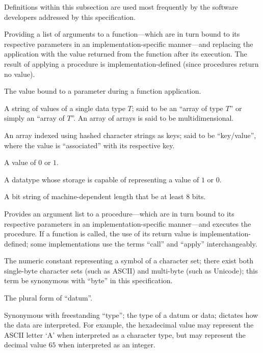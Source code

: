 %


Definitions within this subsection are used most frequently by the software
developers addressed by this specification.

\begin{description}
  Providing a list of arguments to a function---which are in turn bound to its
  respective parameters in an implementation-specific manner---and replacing the
  application with the value returned from the function after its execution. The
  result of applying a procedure is implementation-defined (since procedures
  return no value).

  The value bound to a parameter during a function application.

  A string of values of a single data type $T$; said to be an ``array of type
  $T$'' or simply an ``array of $T$''. An array of arrays is said to be
  multidimensional.

  An array indexed using hashed character strings as keys; said to be
  ``key/value'', where the value is ``associated'' with its respective key.

  A value of $0$ or $1$.

  A datatype whose storage is capable of representing a value of $1$ or $0$.

  A bit string of machine-dependent length that \shall be at least $8$ bits.

  Provides an argument list to a procedure---which are in turn bound to its
  respective parameters in an implementation-specific manner---and executes the
  procedure. If a function is called, the use of its return value is
  implementation-defined; some implementations use the terms ``call'' and
  ``apply'' interchangeably.

  The numeric constant representing a symbol of a character set; there exist
  both single-byte character sets (such as ASCII) and multi-byte (such as
  Unicode); this term \shallnot be synonymous with ``byte'' in this
  specification.

  The plural form of ``datum''.

  Synonymous with freestanding ``type''; the type of a datum or data; dictates
  how the data are interpreted. For example, the hexadecimal value  may
  represent the ASCII letter `A' when interpreted as a character type, but may
  represent the decimal value $65$ when interpreted as an integer.


\end{description}
